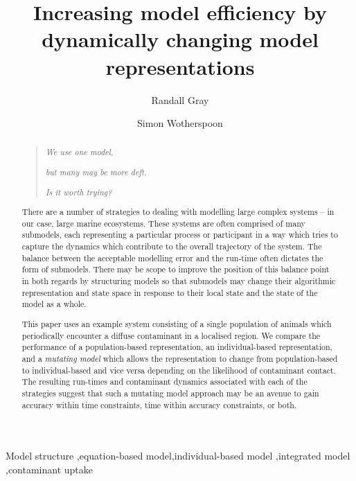\documentclass[preprint,authoryear,5p,twocolumn]{elsarticle}
\begin{document}
\begin{frontmatter}
\title{Increasing model efficiency by dynamically changing model representations}
\author{Randall Gray}
\address{CSIRO Division of Marine and Atmospheric Research}
\author{Simon Wotherspoon}
\address{University of Tasmania}
\begin{abstract}
  \begin{verse}
    {\em{We use one model,}}
    
    {\em{but many may be more deft.}}
    
    {\em{Is it worth trying?}}
  \end{verse}
  
  
  
  There are a number of strategies to dealing with modelling large complex systems -- in our case, large marine
  ecosystems. These systems are often comprised of many submodels, each representing a particular process or
  participant in a way which tries to capture the dynamics which contribute to the overall trajectory of the system.
  The balance between the acceptable modelling error and the run-time often dictates the form of submodels. There may
  be scope to improve the position of this balance point in both regards by structuring models so that submodels may
  change their algorithmic representation and state space in response to their local state and the state of the model
  as a whole.
  
  This paper uses an example system consisting of a single population of animals which periodically encounter a diffuse
  contaminant in a localised region. We compare the performance of a population-based representation, an
  individual-based representation, and a {\em{mutating model}} which allows the representation to change from
  population-based to individual-based and vice versa depending on the likelihood of contaminant contact. The resulting
  run-times and contaminant dynamics associated with each of the strategies suggest that such a mutating model approach
  may be an avenue to gain accuracy within time constraints, time within accuracy constraints, or both.
\end{abstract}
\begin{keyword}
Model structure \sep equation-based model\sep individual-based model
\sep integrated model \sep contaminant uptake
\end{keyword}
\end{frontmatter}
\end{document}
